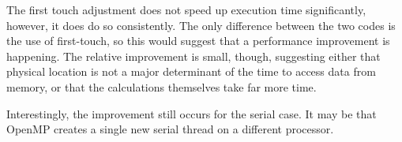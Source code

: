 \documentclass{article}
\begin{document}
The first touch adjustment does not speed up execution time significantly, however, it does do so consistently. The only difference between the two codes is the use of first-touch, so this would suggest that a performance improvement is happening. The relative improvement is small, though, suggesting either that physical location is not a major determinant of the time to access data from memory, or that the calculations themselves take far more time.

Interestingly, the improvement still occurs for the serial case. It may be that OpenMP creates a single new serial thread on a different processor.
\end{document}
